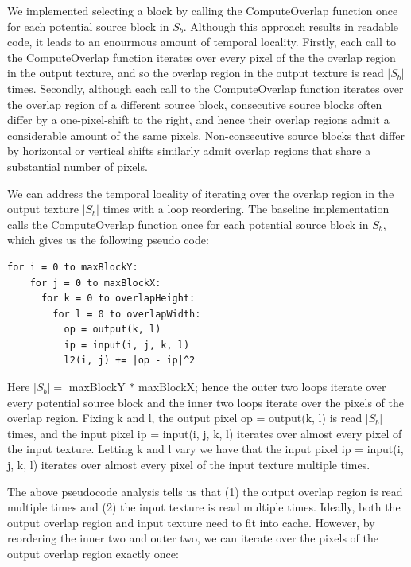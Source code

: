 \documentclass[letterpaper]{article}
\newcommand{\inline}[1]{{\ttfamily\hyphenchar\font=45 #1}}
\begin{document}
We implemented selecting a block by calling the \inline{ComputeOverlap} function once for each potential source block in $S_b$. Although this approach results in readable code, it leads to an enourmous amount of temporal locality. Firstly, each call to the \inline{ComputeOverlap} function iterates over every pixel of the the overlap region in the output texture, and so the overlap region in the output texture is read $|S_b|$ times. Secondly, although each call to the \inline{ComputeOverlap} function iterates over the overlap region of a different source block, consecutive source blocks often differ by a one-pixel-shift to the right, and hence their overlap regions admit a considerable amount of the same pixels. Non-consecutive source blocks that differ by horizontal or vertical shifts similarly admit overlap regions that share a substantial number of pixels.

We can address the temporal locality of iterating over the overlap region in the output texture $|S_b|$ times with a loop reordering. The baseline implementation calls the \inline{ComputeOverlap} function once for each potential source block in $S_b$, which gives us the following pseudo code:

\begin{lstlisting}[style=cppstyle]
  for i = 0 to maxBlockY:
    for j = 0 to maxBlockX:
      for k = 0 to overlapHeight:
        for l = 0 to overlapWidth:
          op = output(k, l)
          ip = input(i, j, k, l)
          l2(i, j) += |op - ip|^2
\end{lstlisting}

Here $|S_b| =$ maxBlockY $ * $ maxBlockX; hence the outer two loops iterate over every potential source block and the inner two loops iterate over the pixels of the overlap region. Fixing \inline{k} and \inline{l}, the output pixel \inline{op = output(k, l)} is read $|S_b|$ times, and the input pixel \inline{ip = input(i, j, k, l)} iterates over almost every pixel of the input texture. Letting \inline{k} and \inline{l} vary we have that the input pixel \inline{ip = input(i, j, k, l)} iterates over almost every pixel of the input texture multiple times. 

The above pseudocode analysis tells us that (1) the output overlap region is read multiple times and (2) the input texture is read multiple times. Ideally, both the output overlap region and input texture need to fit into cache. However, by reordering the inner two and outer two, we can iterate over the pixels of the output overlap region exactly once:
\end{document}
